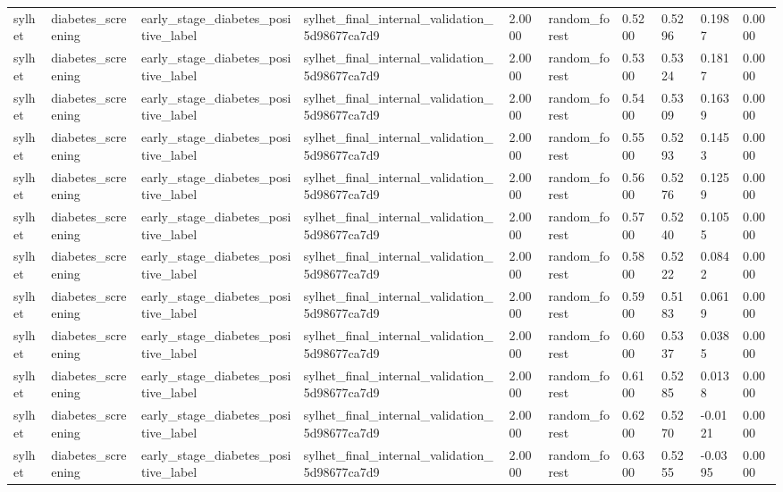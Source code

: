 \begin{tabular}{llllllllll}
sylhet & diabetes\_screening & early\_stage\_diabetes\_positive\_label & sylhet\_final\_internal\_validation\_5d98677ca7d9 & 2.0000 & random\_forest & 0.5200 & 0.5296 & 0.1987 & 0.0000 \\
sylhet & diabetes\_screening & early\_stage\_diabetes\_positive\_label & sylhet\_final\_internal\_validation\_5d98677ca7d9 & 2.0000 & random\_forest & 0.5300 & 0.5324 & 0.1817 & 0.0000 \\
sylhet & diabetes\_screening & early\_stage\_diabetes\_positive\_label & sylhet\_final\_internal\_validation\_5d98677ca7d9 & 2.0000 & random\_forest & 0.5400 & 0.5309 & 0.1639 & 0.0000 \\
sylhet & diabetes\_screening & early\_stage\_diabetes\_positive\_label & sylhet\_final\_internal\_validation\_5d98677ca7d9 & 2.0000 & random\_forest & 0.5500 & 0.5293 & 0.1453 & 0.0000 \\
sylhet & diabetes\_screening & early\_stage\_diabetes\_positive\_label & sylhet\_final\_internal\_validation\_5d98677ca7d9 & 2.0000 & random\_forest & 0.5600 & 0.5276 & 0.1259 & 0.0000 \\
sylhet & diabetes\_screening & early\_stage\_diabetes\_positive\_label & sylhet\_final\_internal\_validation\_5d98677ca7d9 & 2.0000 & random\_forest & 0.5700 & 0.5240 & 0.1055 & 0.0000 \\
sylhet & diabetes\_screening & early\_stage\_diabetes\_positive\_label & sylhet\_final\_internal\_validation\_5d98677ca7d9 & 2.0000 & random\_forest & 0.5800 & 0.5222 & 0.0842 & 0.0000 \\
sylhet & diabetes\_screening & early\_stage\_diabetes\_positive\_label & sylhet\_final\_internal\_validation\_5d98677ca7d9 & 2.0000 & random\_forest & 0.5900 & 0.5183 & 0.0619 & 0.0000 \\
sylhet & diabetes\_screening & early\_stage\_diabetes\_positive\_label & sylhet\_final\_internal\_validation\_5d98677ca7d9 & 2.0000 & random\_forest & 0.6000 & 0.5337 & 0.0385 & 0.0000 \\
sylhet & diabetes\_screening & early\_stage\_diabetes\_positive\_label & sylhet\_final\_internal\_validation\_5d98677ca7d9 & 2.0000 & random\_forest & 0.6100 & 0.5285 & 0.0138 & 0.0000 \\
sylhet & diabetes\_screening & early\_stage\_diabetes\_positive\_label & sylhet\_final\_internal\_validation\_5d98677ca7d9 & 2.0000 & random\_forest & 0.6200 & 0.5270 & -0.0121 & 0.0000 \\
sylhet & diabetes\_screening & early\_stage\_diabetes\_positive\_label & sylhet\_final\_internal\_validation\_5d98677ca7d9 & 2.0000 & random\_forest & 0.6300 & 0.5255 & -0.0395 & 0.0000 \\

\end{tabular}
